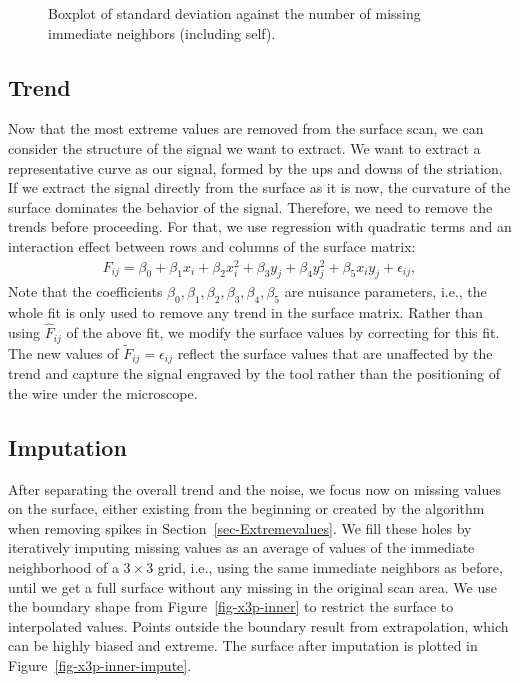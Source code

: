 \documentclass[
  authoryear,
  preprint,
  5p,
  twocolumn]{elsarticle}
\begin{document}
\begin{figure}


\caption{\label{fig-insidepoly-df-boxplot}Boxplot of standard deviation
against the number of missing immediate neighbors (including self).}

\end{figure}%

\subsection{Trend}\label{sec-Trend}

Now that the most extreme values are removed from the surface scan, we
can consider the structure of the signal we want to extract. We want to
extract a representative curve as our signal, formed by the ups and
downs of the striation. If we extract the signal directly from the
surface as it is now, the curvature of the surface dominates the
behavior of the signal. Therefore, we need to remove the trends before
proceeding. For that, we use regression with quadratic terms and an
interaction effect between rows and columns of the surface matrix:
\begin{align*}
    F_{ij} = \beta_0 + \beta_1 x_i + \beta_2 x_i ^ 2 + \beta_3 y_j + \beta_4 y_j ^ 2 + \beta_5 x_i y_j + \epsilon_{ij},
\end{align*} Note that the coefficients
\(\beta_0, \beta_1, \beta_2, \beta_3, \beta_4, \beta_5\) are nuisance
parameters, i.e., the whole fit is only used to remove any trend in the
surface matrix. Rather than using \(\hat{F}_{ij}\) of the above fit, we
modify the surface values by correcting for this fit. The new values of
\(\tilde{F}_{ij} = \epsilon_{ij}\) reflect the surface values that are
unaffected by the trend and capture the signal engraved by the tool
rather than the positioning of the wire under the microscope.

\subsection{Imputation}\label{sec-Imputation}

After separating the overall trend and the noise, we focus now on
missing values on the surface, either existing from the beginning or
created by the algorithm when removing spikes in
Section~\ref{sec-Extremevalues}. We fill these holes by iteratively
imputing missing values as an average of values of the immediate
neighborhood of a \(3 \times 3\) grid, i.e., using the same immediate
neighbors as before, until we get a full surface without any missing in
the original scan area. We use the boundary shape from
Figure~\ref{fig-x3p-inner} to restrict the surface to interpolated
values. Points outside the boundary result from extrapolation, which can
be highly biased and extreme. The surface after imputation is plotted in
Figure~\ref{fig-x3p-inner-impute}.
\end{document}
